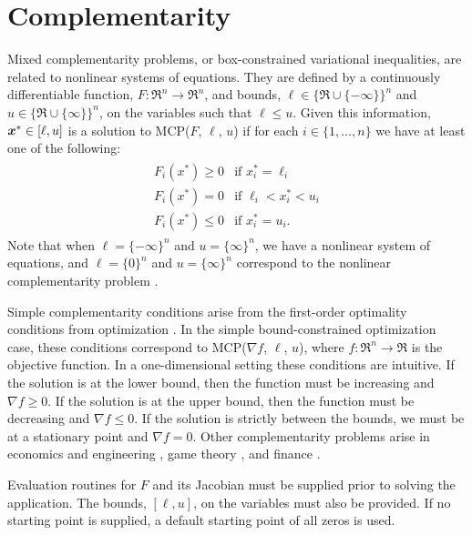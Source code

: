 \section{Complementarity}
\label{sec:complementarity}

Mixed complementarity problems, or box-constrained variational inequalities,
are related to nonlinear systems of equations.  They are defined by a 
continuously differentiable function,
$F:\Re^n \to \Re^n$, and bounds, $\ell \in \{\Re \cup \{-\infty\}\}^n$ 
and $u \in \{\Re \cup \{\infty\}\}^n$, on the variables such that 
$\ell \leq u$.  Given this information, $\mbox{\boldmath \(x\)}^* \in [\ell,u]$ is a solution to 
MCP($F$, $\ell$, $u$) if for each $i \in \{1, \ldots, n\}$ we have at
least one of the following:
\begin{eqnarray*}
\begin{array}{ll}
F_i(x^*) \geq 0 & \mbox{if } x^*_i = \ell_i \\
F_i(x^*) = 0 & \mbox{if } \ell_i < x^*_i < u_i \\
F_i(x^*) \leq 0 & \mbox{if } x^*_i = u_i.
\end{array}
\end{eqnarray*}
Note that when $\ell = \{-\infty\}^n$ and $u = \{\infty\}^n$, we have a 
nonlinear system of equations, and $\ell = \{0\}^n$ and $u = \{\infty\}^n$ 
correspond to the nonlinear complementarity problem \cite{cottle:nonlinear}.

Simple complementarity conditions arise from the first-order optimality 
conditions from optimization \cite{karush:minima, kuhn.tucker:nonlinear}.  
In the simple bound-constrained optimization case, these conditions 
correspond to MCP($\nabla f$, $\ell$, $u$), where $f: \Re^n \to \Re$ 
is the objective function.  In a one-dimensional setting these conditions 
are intuitive.  If the solution is at the lower bound, then the function must 
be increasing and $\nabla f \geq 0$.  If the solution is at the 
upper bound, then the function must be decreasing and $\nabla f \leq 0$.  
If the solution 
is strictly between the bounds, we must be at a stationary point and 
$\nabla f = 0$.  Other complementarity problems arise in economics and 
engineering \cite{ferris.pang:engineering}, game 
theory \cite{nash:equilibrium}, and finance \cite{huang.pang:option}.

Evaluation routines for $F$ and its Jacobian must be supplied prior
to solving the application.
The bounds, $[\ell,u]$, on the variables must also be 
provided.  
If no starting point is supplied, a default starting point of all zeros 
is used.

